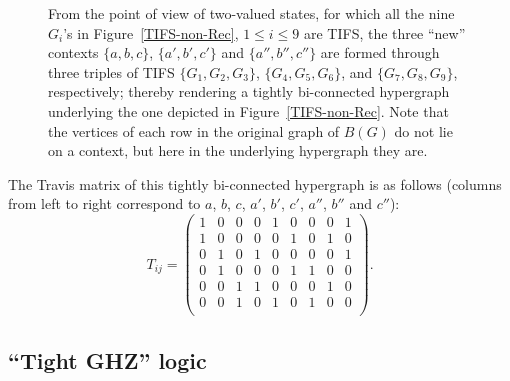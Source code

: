 \documentclass[%
12pt,
prereprint,
showpacs,
showkeys,
preprintnumbers,
amsmath,amssymb,
aps,
pra,
longbibliography,
notitlepage
]{revtex4-1}
\theoremstyle{definition}
\begin{document}
\begin{figure}
\begin{center}
		\end{center}
		\caption{\label{Fig:underlying}
			From the point of view of two-valued states, for which all the nine $G_i$'s in Figure~\ref{TIFS-non-Rec}, $1\le i\le 9$  are TIFS, the three ``new'' contexts
			$\{a, b, c\}$, $\{a', b', c'\}$ and $\{a'', b'',c''\}$ are formed
			through three triples of TIFS
			$\{G_1,G_2,G_3\}$, $\{G_4,G_5,G_6\}$, and $\{G_7,G_8,G_9\}$, respectively; thereby rendering a tightly bi-connected hypergraph underlying the one depicted in Figure~\ref{TIFS-non-Rec}. Note that the vertices of each row in the original graph of $B(G)$ do not lie on a context, but here in the underlying hypergraph they are.
		}
	\end{figure}
	
	The Travis matrix of this tightly bi-connected hypergraph is as follows (columns from left to right correspond to $a$, $b$, $c$, $a'$, $b'$, $c'$, $a''$, $b''$ and $c''$):
	\begin{equation}\label{underlying-Travice}
		T_{ij}=\begin{pmatrix}
			1 &  0 & 0 & 0 & 1 & 0 & 0 & 0 & 1    \\
			1 &  0 & 0 & 0 & 0 & 1 & 0 & 1 & 0    \\
			0 &  1 & 0 & 1 & 0 & 0 & 0 & 0 & 1    \\
			0 &  1 & 0 & 0 & 0 & 1 & 1 & 0 & 0    \\
			0 &  0 & 1 & 1 & 0 & 0 & 0 & 1 & 0    \\
			0 &  0 & 1 & 0 & 1 & 0 & 1 & 0 & 0    \\
		\end{pmatrix}
		.
	\end{equation}
	
	\subsection{``Tight GHZ'' logic}
	
\end{document}
